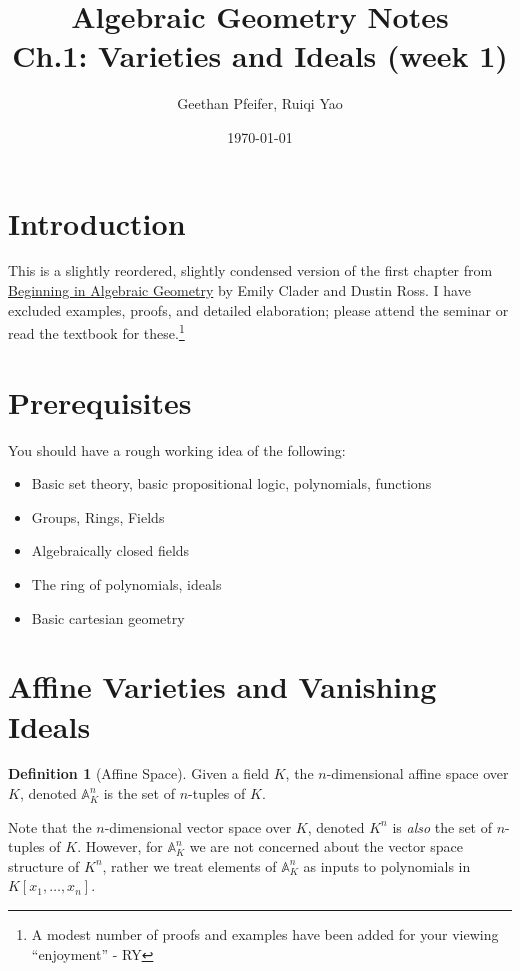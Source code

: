 \documentclass[12pt, a4paper]{article}
\title{\textbf{Algebraic Geometry Notes}\\[0.3em]
\large Ch.1: Varieties and Ideals (week 1)}
\author{Geethan Pfeifer, Ruiqi Yao}
\date{\today}
\theoremstyle{definition}
\newtheorem{definition}{Definition}
\begin{document}
\maketitle

\tableofcontents
\newpage


\section{Introduction}
This is a slightly reordered, slightly condensed version of the first chapter from \href{https://drive.google.com/file/d/1cJFa9-rGcWDeoQM7paC0mXDbJvZycG4O/view}{Beginning in Algebraic Geometry} by Emily Clader and Dustin Ross. I have excluded examples, proofs, and detailed elaboration; please attend the seminar or read the textbook for these.\footnote{A modest number of proofs and examples have been added for your viewing ``enjoyment'' - RY}

\section{Prerequisites}
You should have a rough working idea of the following:
\begin{itemize}
    \item Basic set theory, basic propositional logic, polynomials, functions
    \item Groups, Rings, Fields
    \item Algebraically closed fields
    \item The ring of polynomials, ideals
    \item Basic cartesian geometry
\end{itemize}

\section{Affine Varieties and Vanishing Ideals}
\begin{definition}[Affine Space]
	Given a field $K$, the $n$-dimensional affine space over $K$, denoted $\mathbb{A}^n_K$ is the set of $n$-tuples of $K$.
\end{definition}
Note that the $n$-dimensional vector space over $K$, denoted $K^n$ is \textit{also} the set of $n$-tuples of $K$.  However, for $\mathbb{A}^n_K$ we are not concerned about the vector space structure of $K^n$, rather we treat elements of $\mathbb{A}^n_K$ as inputs to polynomials in $K[x_1, \dots, x_n]$.
\end{document}
